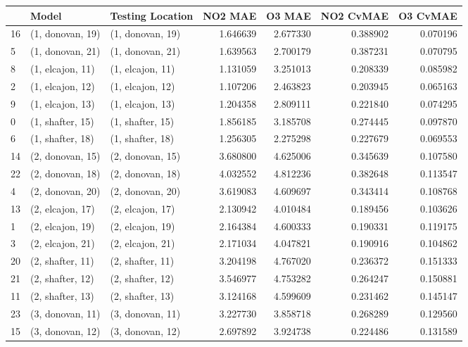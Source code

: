 \begin{tabular}{lllrrrr}
\toprule
{} &             Model &  Testing Location &   NO2 MAE &    O3 MAE &  NO2 CvMAE &  O3 CvMAE \\
\midrule
16 &  (1, donovan, 19) &  (1, donovan, 19) &  1.646639 &  2.677330 &   0.388902 &  0.070196 \\
5  &  (1, donovan, 21) &  (1, donovan, 21) &  1.639563 &  2.700179 &   0.387231 &  0.070795 \\
8  &  (1, elcajon, 11) &  (1, elcajon, 11) &  1.131059 &  3.251013 &   0.208339 &  0.085982 \\
2  &  (1, elcajon, 12) &  (1, elcajon, 12) &  1.107206 &  2.463823 &   0.203945 &  0.065163 \\
9  &  (1, elcajon, 13) &  (1, elcajon, 13) &  1.204358 &  2.809111 &   0.221840 &  0.074295 \\
0  &  (1, shafter, 15) &  (1, shafter, 15) &  1.856185 &  3.185708 &   0.274445 &  0.097870 \\
6  &  (1, shafter, 18) &  (1, shafter, 18) &  1.256305 &  2.275298 &   0.227679 &  0.069553 \\
14 &  (2, donovan, 15) &  (2, donovan, 15) &  3.680800 &  4.625006 &   0.345639 &  0.107580 \\
22 &  (2, donovan, 18) &  (2, donovan, 18) &  4.032552 &  4.812236 &   0.382648 &  0.113547 \\
4  &  (2, donovan, 20) &  (2, donovan, 20) &  3.619083 &  4.609697 &   0.343414 &  0.108768 \\
13 &  (2, elcajon, 17) &  (2, elcajon, 17) &  2.130942 &  4.010484 &   0.189456 &  0.103626 \\
1  &  (2, elcajon, 19) &  (2, elcajon, 19) &  2.164384 &  4.600333 &   0.190331 &  0.119175 \\
3  &  (2, elcajon, 21) &  (2, elcajon, 21) &  2.171034 &  4.047821 &   0.190916 &  0.104862 \\
20 &  (2, shafter, 11) &  (2, shafter, 11) &  3.204198 &  4.767020 &   0.236372 &  0.151333 \\
21 &  (2, shafter, 12) &  (2, shafter, 12) &  3.546977 &  4.753282 &   0.264247 &  0.150881 \\
11 &  (2, shafter, 13) &  (2, shafter, 13) &  3.124168 &  4.599609 &   0.231462 &  0.145147 \\
23 &  (3, donovan, 11) &  (3, donovan, 11) &  3.227730 &  3.858718 &   0.268289 &  0.129560 \\
15 &  (3, donovan, 12) &  (3, donovan, 12) &  2.697892 &  3.924738 &   0.224486 &  0.131589 \\

\end{tabular}
